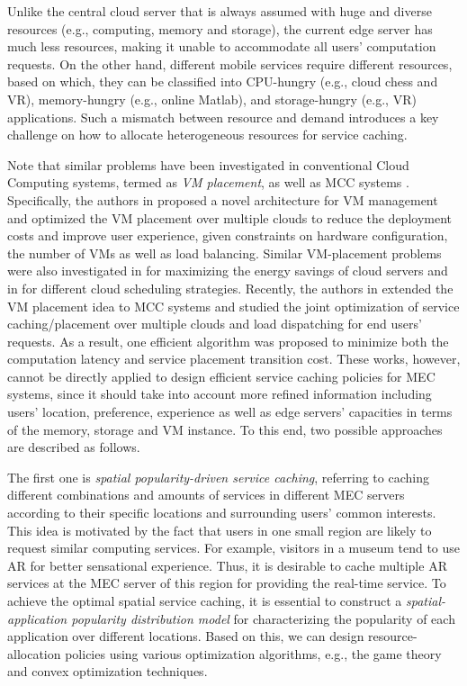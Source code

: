 \documentclass[journal]{IEEEtran}
\begin{document}
{Unlike the central cloud server that is always assumed with huge and diverse resources (e.g., computing, memory and storage),  the current edge server has much less resources, making it unable to accommodate all users' computation requests. On the other hand, different mobile services require different resources, based on which, they can be classified into CPU-hungry (e.g., cloud chess and VR), memory-hungry (e.g., online Matlab), and storage-hungry (e.g., VR) applications. Such a mismatch between resource and demand introduces a key challenge on how to allocate heterogeneous resources for service caching.

Note that similar problems have been investigated in conventional Cloud Computing systems\cite{tordsson2012cloud,li2009enacloud, gao2013multi,lucas2013scheduling}, termed as \emph{VM placement}, as well as MCC systems \cite{yang2016cost}. Specifically, the authors in \cite{tordsson2012cloud} proposed a novel architecture for VM management and optimized the VM placement over multiple clouds to reduce the deployment costs and improve user experience, given constraints on hardware configuration, the number of VMs as well as load balancing. Similar VM-placement problems were also investigated in \cite{li2009enacloud, gao2013multi} for maximizing the energy savings of cloud servers and in \cite{lucas2013scheduling} for different cloud scheduling strategies. Recently, the authors in \cite{yang2016cost} extended the VM placement idea to MCC systems and studied the joint optimization of service caching/placement over multiple clouds and load dispatching for end users' requests. As a result, one efficient algorithm was proposed to minimize both the computation latency and service placement transition cost. These works, however, cannot be directly applied to design efficient service caching policies for MEC systems, since it should take into account more refined information including users' location, preference, experience as well as edge servers' capacities in terms of the memory, storage and VM instance. To this end, two possible approaches are described as follows.

The first one is \emph{spatial popularity-driven service caching}, referring to caching different combinations and amounts of services in different MEC servers according to their specific locations and surrounding users' common interests. This idea is motivated by the fact that users in one small region are likely to request similar computing services. For example, visitors in a museum tend to use AR for better sensational experience. Thus, it is desirable to cache multiple AR services at the MEC server of this region for providing the real-time service. To achieve the optimal spatial service caching, it is essential to construct a \emph{spatial-application popularity distribution model} for characterizing the popularity of each application over different locations. Based on this, we can design resource-allocation policies using various optimization algorithms, e.g., the game theory and convex optimization techniques.

}
\end{document}
